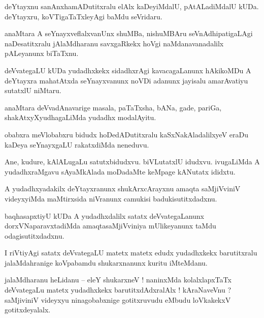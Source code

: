 \documentclass{article}
\begin{document}
\begin{mn}%
deYtayxnu sanAnxhamADutitxralu elAlx kaDeyiMdalU, pAtALadiMdalU kUDa. deYtayxru, koVTigaTaTxleyAgi 
baMdu seVridaru. 
\end{mn}

\begin{mn}%
anaMtara A seYnayxveflalxvanUnx shuMBa, nishuMBAru seVnAdhipatigaLAgi naDesatitxralu jAlaMdharanu 
savxgaRkekx hoVgi naMdanavanadalilx pALeyanunx biTaTxnu.
\end{mn}

\begin{mn}%
deVvategaLU kUDa yudadhxkekx sidadhxrAgi kavacagaLanunx hAkikoMDu A deYtayxra mahatAtxda 
seYnayxvanunx noVDi adanunx jayisalu amarAvatiyu sutatxlU niMtaru.
\end{mn}

\begin{mn}%
anaMtara deVvadAnavarige masala, paTaTxsha, bANa, gade, pariGa, shakAtxyXyudhagaLiMda yudadhx 
modalAyitu.
\end{mn}

\begin{mn}%
obabxra meVlobabxru bidudx hoDedADutitxralu kaSxNakAladalilxyeV eraDu kaDeya seYnayxgaLU 
rakatxdiMda neneduvu.
\end{mn}

\begin{mn}%
Ane, kudure, kAlALugaLu satutxbidudxvu. biVLutatxlU idudxvu. ivugaLiMda A yudadhxraMgavu 
sAyaMkAlada moDadaMte keMpage kANutatx ididxtu.
\end{mn}

\begin{mn}%
A yudadhxyadakilx deYtayxranunx shukArxcArayxnu amaqta saMjiVviniV videyxyiMda maMtirxsida 
niVranunx camukisi badukisutitxdadxnu.
\end{mn}

\begin{mn}%
baqhasapxtiyU kUDa A yudadhxdalilx satatx deVvategaLanunx dorxVNaparavxtadiMda amaqtasaMjiVviniya 
mUlikeyanunx taMdu odagisutitxdadxnu.
\end{mn}

\begin{mn}%
I riVtiyAgi satatx deVvategaLU matetx matetx edudx yudadhxkekx barutitxralu jalaMdahranige 
koVpabamdu shukarxnanunx kuritu iMteMdanu.
\end{mn}

\begin{mn}%
jalaMdharanu heLidanu -- eleY shukarxneV ! naninxMda kolalxlapxTaTx deVvategaLu matetx yudadhxkekx  
barutitxdAdxralAlx ! kAraNaveVnu ? saMjiviniV videyxyu ninagobabxnige gotitxruvudu eMbudu 
loVkakekxV gotitxdeyalalx.
\end{mn}
\end{document}
